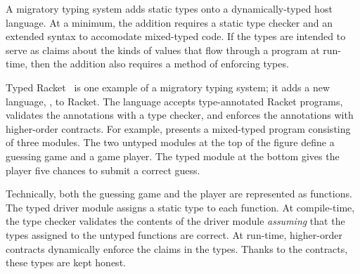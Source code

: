A migratory typing system adds static types onto a
dynamically-typed host language.
At a minimum, the addition requires a static type checker and an extended
syntax to accomodate mixed-typed code.
If the types are intended to serve as claims about the kinds of values that
flow through a program at run-time, then the addition also requires a method
of enforcing types.

Typed Racket~\cite{tf-popl-2008} is one example of a migratory typing system; it adds
a new language, , to Racket.
The language accepts type-annotated Racket programs,
validates the annotations with a type checker,
and enforces the annotations with higher-order contracts.
For example,  presents a mixed-typed
program consisting of three modules.
The two untyped modules at the top of the figure define a guessing game
and a game player.
The typed module at the bottom gives the player five chances to submit a
correct guess.

Technically, both the guessing game and the player are represented as functions.
The typed driver module assigns a static type to each function.
At compile-time, the type checker validates the contents of the driver module
\emph{assuming}\/ that the types assigned to the untyped functions are correct.
At run-time, higher-order contracts dynamically enforce the claims in the types.
Thanks to the contracts, these types are kept honest.

